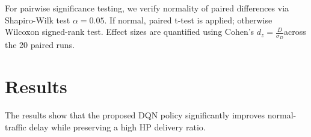 \documentclass[runningheads,a4paper]{llncs}
\begin{document}
For pairwise significance testing, we verify normality of paired differences via Shapiro-Wilk test $\alpha = 0.05$. If normal, paired t-test is applied; otherwise Wilcoxon signed-rank test. Effect sizes are quantified using Cohen’s $d_z = \frac{D}{\sigma_D}$across the 20 paired runs.

\section{Results}
\label{sec:results}
The results show that the proposed DQN policy significantly improves normal-
traffic delay while preserving a high HP delivery ratio.

\begin{table}[t]
\centering
\caption{WSN Performance Metrics Across 20 Matched Evaluation Runs (Mean $\pm$ 95\% CI).}
\label{tab:main_results}
\end{table}
\end{document}
